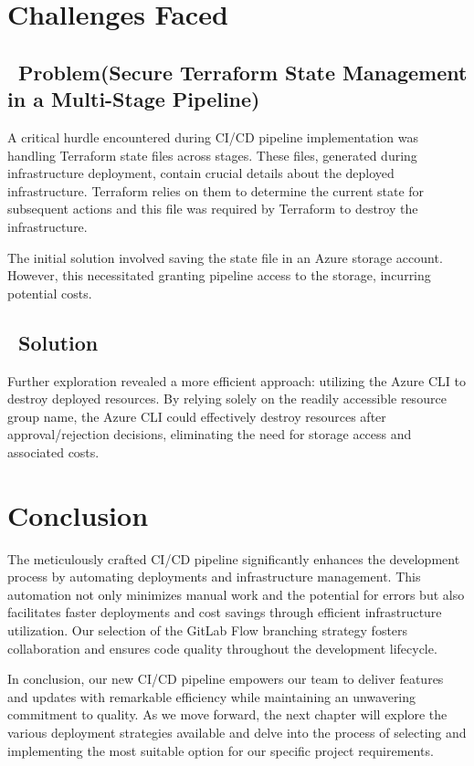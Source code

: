 \section{Challenges Faced}
\subsection*{ \textbullet\ Problem(Secure Terraform State Management in a Multi-Stage Pipeline)}
A critical hurdle encountered during CI/CD pipeline implementation was handling Terraform state files across stages. These files, generated during infrastructure deployment,  contain crucial details about the deployed infrastructure. Terraform relies on them to determine the current state for subsequent actions and this file was required by Terraform to destroy the infrastructure.
\par The initial solution involved saving the state file in an Azure storage account. However, this necessitated granting pipeline access to the storage, incurring potential costs.
\subsection*{ \textbullet\ Solution}
Further exploration revealed a more efficient approach: utilizing the Azure CLI to destroy deployed resources. By relying solely on the readily accessible resource group name, the Azure CLI could effectively destroy resources after approval/rejection decisions, eliminating the need for storage access and associated costs.
\section*{Conclusion}
The meticulously crafted CI/CD pipeline significantly enhances the development process by automating deployments and infrastructure management. This automation not only minimizes manual work and the potential for errors but also facilitates faster deployments and cost savings through efficient infrastructure utilization.
Our selection of the GitLab Flow branching strategy fosters collaboration and ensures code quality throughout the development lifecycle.
\par
In conclusion, our new CI/CD pipeline empowers our team to deliver features and updates with remarkable efficiency while maintaining an unwavering commitment to quality. As we move forward, the next chapter will explore the various deployment strategies available and delve into the process of selecting and implementing the most suitable option for our specific project requirements.
